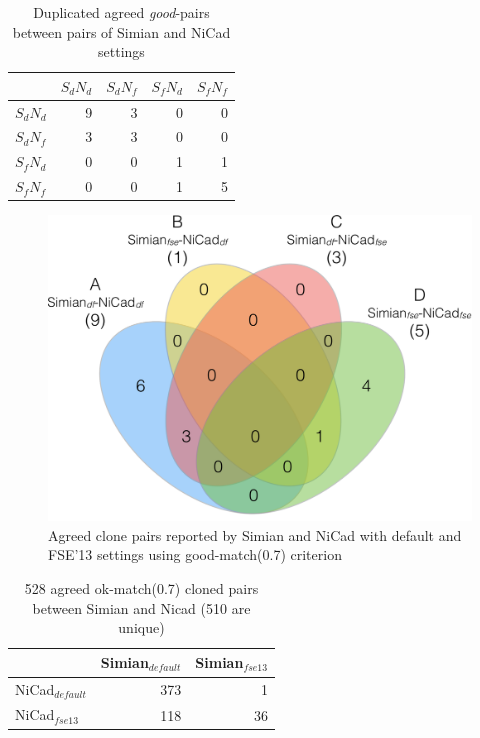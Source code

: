\documentclass{IEEEtran}
\begin{document}
\begin{table}[H]
	\centering
	\caption{Duplicated agreed \textit{good}-pairs between pairs of Simian and NiCad settings}
	\label{t_dup_agreed_good_clone_pairs}
	\begin{tabular}{l|r|r|r|r}
		\hline
		& $S_dN_d$ & $S_dN_f$ & $S_fN_d$ & $S_fN_f$ \\ %
		\hline
		$S_dN_d$ & 9 & 3 & 0 & 0 \\%
		$S_dN_f$ & 3 & 3 & 0 & 0 \\ %
		$S_fN_d$ & 0 & 0 & 1 & 1 \\
		$S_fN_f$ & 0 & 0 & 1 & 5 \\	
		\hline
	\end{tabular}
\end{table}

\begin{figure}[H]
	\centering
	\includegraphics[width=0.5\linewidth]{venn4_pairs_good}
	\caption[Agreed clone pairs reported by Simian and NiCad with default and FSE'13 settings using good-match(0.7) criterion]{Agreed clone pairs reported by Simian and NiCad with default and FSE'13 settings using good-match(0.7) criterion}
	\label{fig:venn4_pairs}
\end{figure}

\begin{table}[h]
	\centering
	\caption{528 agreed ok-match(0.7) cloned pairs between Simian and Nicad (510 are unique)}
	\label{t_agreed_ok_clone_pairs}
	\begin{tabular}{l|r|r}
		\hline
		& Simian$_{\mathrm{\textit{default}}}$ & Simian$_{\mathrm{\textit{fse13}}}$ \\ %
		\hline
		NiCad$_{\mathrm{\textit{default}}}$ & 373 & 1 \\%
		NiCad$_{\mathrm{\textit{fse13}}}$   & 118 & 36 \\ %
		\hline
	\end{tabular}
\end{table}
\end{document}
